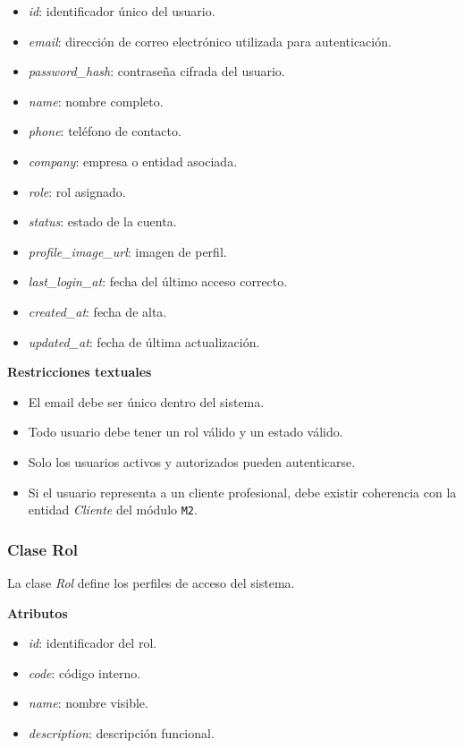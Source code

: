 \begin{itemize}
      \item \textit{id}: identificador único del usuario.
      \item \textit{email}: dirección de correo electrónico utilizada para autenticación.
      \item \textit{password\_hash}: contraseña cifrada del usuario.
      \item \textit{name}: nombre completo.
      \item \textit{phone}: teléfono de contacto.
      \item \textit{company}: empresa o entidad asociada.
      \item \textit{role}: rol asignado.
      \item \textit{status}: estado de la cuenta.
      \item \textit{profile\_image\_url}: imagen de perfil.
      \item \textit{last\_login\_at}: fecha del último acceso correcto.
      \item \textit{created\_at}: fecha de alta.
      \item \textit{updated\_at}: fecha de última actualización.
\end{itemize}

\textbf{Restricciones textuales}

\begin{itemize}
      \item El email debe ser único dentro del sistema.
      \item Todo usuario debe tener un rol válido y un estado válido.
      \item Solo los usuarios activos y autorizados pueden autenticarse.
      \item Si el usuario representa a un cliente profesional, debe existir coherencia con la entidad \textit{Cliente} del módulo \texttt{M2}.
\end{itemize}

\subsubsection{Clase Rol}

La clase \textit{Rol} define los perfiles de acceso del sistema.

\textbf{Atributos}

\begin{itemize}
      \item \textit{id}: identificador del rol.
      \item \textit{code}: código interno.
      \item \textit{name}: nombre visible.
      \item \textit{description}: descripción funcional.
\end{itemize}

